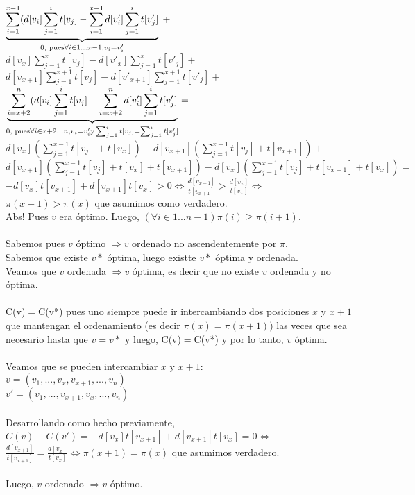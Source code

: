 \documentclass[11pt, a4paper, twoside]{article}
\begin{document}
$ \underbrace{\sum_{i=1}^{x-1} (d[v_i]\sum_{j=1}^{i} t[v_j]-\sum_{i=1}^{x-1}d[v'_i]\sum_{j=1}^{i} t[v'_j]}_{0,\textnormal{ pues} \forall i \in 1...x-1, v_i=v'_i}$ + 
$\displaystyle{d[v_x]\sum_{j=1}^{x} t[v_j] - d[v'_x]\sum_{j=1}^{x}t[v'_j] +}$ \\ 
$\displaystyle{d[v_{x+1}]\sum_{j=1}^{x+1} t[v_j] - d[v'_{x+1}]\sum_{j=1}^{x+1}t[v'_j] + }$ 
$\underbrace{\sum_{i=x+2}^{n} (d[v_i]\sum_{j=1}^{i} t[v_j]-\sum_{i=x+2}^{n}d[v'_i]\sum_{j=1}^{i} t[v'_j]}_{0,\textnormal{ pues} \forall i \in x+2...n, v_i=v'_i \textnormal{y} \sum_{j=1}^{i}t[v_j]=\sum_{j=1}^{i}t[v'_j]} =$ \\
$\displaystyle{d[v_x](\sum_{j=1}^{x-1} t[v_j]+ t[v_x]) - d[v_{x+1}](\sum_{j=1}^{x-1} t[v_j] + t[v_{x+1}]) + }$ \\
$\displaystyle{d[v_{x+1}](\sum_{j=1}^{x-1} t[v_j] + t[v_x] + t[v_{x+1}]) - d[v_x](\sum_{j=1}^{x-1} t[v_j] + t[v_{x+1}] + t[v_x])=} $\\
$\displaystyle{-d[v_x] t[v_{x+1}] + d[v_{x+1}] t[v_x] > 0 \Leftrightarrow \frac{d[v_{x+1}]}{t[v_{x+1}]} > \frac{d[v_x]}{t[v_x]} } \Leftrightarrow $ \\
$\displaystyle{\pi(x+1) > \pi(x) }$ que asumimos como verdadero. \\
Abs! Pues $v$ era óptimo. Luego, $(\forall i \in 1...n-1) \pi(i) \ge \pi(i+1)$. \\
\\
Sabemos pues $v$ óptimo $\Rightarrow v$ ordenado no ascendentemente por $\pi$. \\
Sabemos que existe $v*$ óptima, luego existte $v*$ óptima y ordenada. \\
Veamos que $v$ ordenada $\Rightarrow v$ óptima, es decir que no existe $v$ ordenada y no óptima. \\
\\
C(v)$=$C(v*) pues uno siempre puede ir intercambiando dos posiciones $x$ y $x+1$ que mantengan el ordenamiento (es decir $\pi(x)=\pi(x+1))$ las veces que sea necesario hasta que $v=v*$ y luego, C(v)$=$C(v*) y por lo tanto, $v$ óptima. \\
\\
Veamos que se pueden intercambiar $x$ y $x+1$: \\
$v = (v_1,...,v_x,v_{x+1},...,v_n)$ \\
$v'= (v_1,...,v_{x+1},v_x,...,v_n)$ \\
\\
Desarrollando como hecho previamente, \\
$\displaystyle{C(v) - C(v') = -d[v_x]t[v_{x+1}] + d[v_{x+1}]t[v_x]=0 \Leftrightarrow }$\\
$\displaystyle{\frac{d[v_{x+1}]}{t[v_{x+1}]} = \frac{d[v_x]}{t[v_x]} \Leftrightarrow \pi(x+1) = \pi(x)}$ que asumimos verdadero. \\
\\
Luego, $v$ ordenado $\Rightarrow v$ óptimo. \\ 
\end{document}

